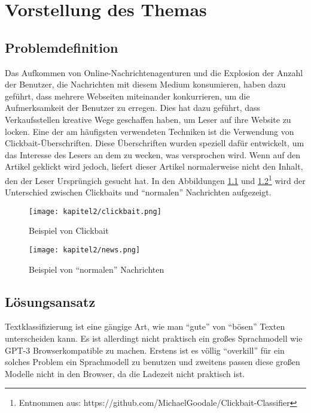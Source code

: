 \chapter{Vorstellung des Themas}
\section{Problemdefinition}
Das Aufkommen von Online-Nachrichtenagenturen und die Explosion der Anzahl der Benutzer, die Nachrichten mit diesem Medium konsumieren, haben dazu geführt, dass mehrere Webseiten miteinander konkurrieren, um die Aufmerksamkeit der Benutzer zu erregen. Dies hat dazu geführt, dass Verkaufsstellen kreative Wege geschaffen haben, um Leser auf ihre Website zu locken. Eine der am häufigsten verwendeten Techniken ist die Verwendung von Clickbait-Überschriften. Diese Überschriften wurden speziell dafür entwickelt, um das Interesse des Lesers an dem zu wecken, was versprochen wird. Wenn auf den Artikel geklickt wird jedoch, liefert dieser Artikel normalerweise nicht den Inhalt, den der Leser Ursprüngich gesucht hat. In den Abbildungen \ref{Kap2:ClickBait} und \ref{Kap2:News}\footnote{Entnommen aus: https://github.com/MichaelGoodale/Clickbait-Classifier} wird der Unterschied zwischen Clickbaits und \enquote{normalen} Nachrichten aufgezeigt.

\begin{figure}[ht]
  \centering
  \texttt{[image: kapitel2/clickbait.png]}
  \caption[Beispiel von Clickbait]{Beispiel von Clickbait}
  \label{Kap2:ClickBait}
\end{figure}


\begin{figure}[ht]
  \centering
  \texttt{[image: kapitel2/news.png]}
  \caption[Beispiel von \enquote{normalen} Nachrichten]{Beispiel von \enquote{normalen} Nachrichten}
  \label{Kap2:News}
\end{figure}


\section{Lösungsansatz}
Textklassifizierung ist eine gängige Art, wie man \enquote{gute} von \enquote{bösen} Texten unterscheiden kann. Es ist allerdingt nicht praktisch ein großes Sprachmodell wie GPT-3 Browserkompatible zu machen. Erstens ist es völlig \enquote{overkill} für ein solches Problem ein Sprachmodell zu benutzen und zweitens passen diese großen Modelle nicht in den Browser, da die Ladezeit nicht praktisch ist.


